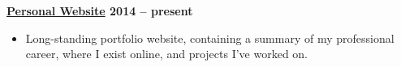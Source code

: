 \textbf{\href{https://jackharrhy.dev/}{Personal Website} \hfill 2014 -- present} \par
\begin{itemize}
	\item Long-standing portfolio website, containing a summary of my professional career, where I exist online, and projects I've worked on.
\end{itemize}\vspace{0.1cm}\par